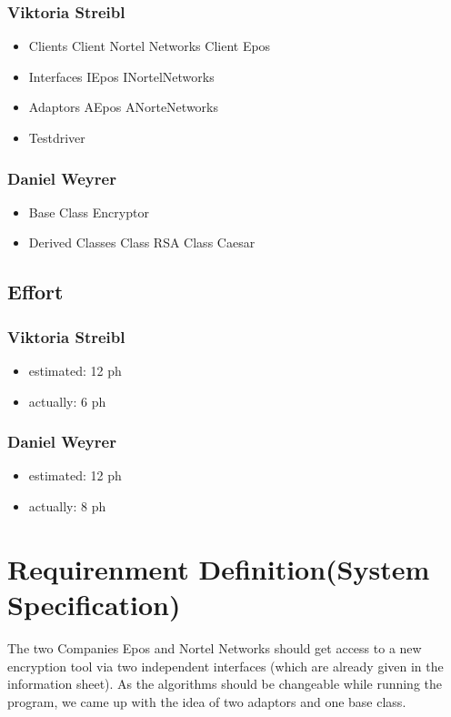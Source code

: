 \subsubsection{Viktoria Streibl}
\begin{itemize}
	\item Clients
	\subitem Client Nortel Networks
	\subitem Client Epos

	\item Interfaces
	\subitem IEpos
	\subitem INortelNetworks

	\item Adaptors
	\subitem AEpos
	\subitem ANorteNetworks
		
	\item Testdriver
	
\end{itemize}

\subsubsection{Daniel Weyrer}
\begin{itemize}
	\item Base Class Encryptor
	\item Derived Classes
		\subitem Class RSA
		\subitem Class Caesar
\end{itemize}

\subsection{Effort}

\subsubsection {Viktoria Streibl}
\begin{itemize}
	\item estimated: 12 ph 
	\item actually: 6 ph
\end{itemize}

\subsubsection {Daniel Weyrer}
\begin{itemize}
	\item estimated: 12 ph 
	\item actually: 8 ph
\end{itemize}

\section{Requirenment Definition(System Specification)}
The two Companies Epos and Nortel Networks should get access to a new encryption tool via two independent interfaces (which are already given in the information sheet). As the algorithms should be changeable while running the program, we came up with the idea of two adaptors and one base class.


